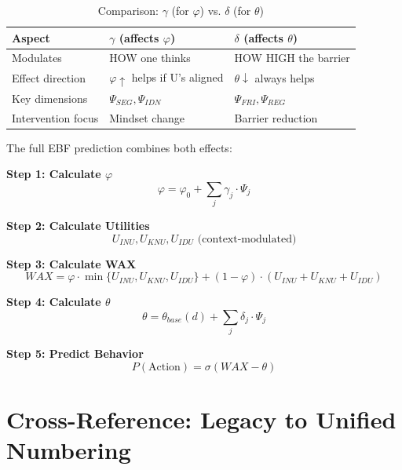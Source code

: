 \begin{table}[htbp]
\centering
\caption{Comparison: $\gamma$ (for $\varphi$) vs. $\delta$ (for $\theta$)}
\label{tab:gamma-vs-delta}
\begin{tabular}{@{}lll@{}}
\toprule
\textbf{Aspect} & \textbf{$\gamma$ (affects $\varphi$)} & \textbf{$\delta$ (affects $\theta$)} \\
\midrule
Modulates & HOW one thinks & HOW HIGH the barrier \\
Effect direction & $\varphi \uparrow$ helps if U's aligned & $\theta \downarrow$ always helps \\
Key dimensions & $\Psi_{SEG}, \Psi_{IDN}$ & $\Psi_{FRI}, \Psi_{REG}$ \\
Intervention focus & Mindset change & Barrier reduction \\
\bottomrule
\end{tabular}
\end{table}

\begin{tcolorbox}[colback=blue!5!white,colframe=blue!75!black,title=Complete Behavioral Prediction Model]
The full EBF prediction combines both effects:

\textbf{Step 1: Calculate $\varphi$}
\begin{equation}
\varphi = \varphi_0 + \sum_j \gamma_j \cdot \Psi_j
\end{equation}

\textbf{Step 2: Calculate Utilities}
\begin{equation}
U_{INU}, U_{KNU}, U_{IDU} \text{ (context-modulated)}
\end{equation}

\textbf{Step 3: Calculate WAX}
\begin{equation}
WAX = \varphi \cdot \min\{U_{INU}, U_{KNU}, U_{IDU}\} + (1-\varphi) \cdot (U_{INU} + U_{KNU} + U_{IDU})
\end{equation}

\textbf{Step 4: Calculate $\theta$}
\begin{equation}
\theta = \theta_{base}(d) + \sum_j \delta_j \cdot \Psi_j
\end{equation}

\textbf{Step 5: Predict Behavior}
\begin{equation}
P(\text{Action}) = \sigma(WAX - \theta)
\end{equation}
\end{tcolorbox}


\section{Cross-Reference: Legacy to Unified Numbering}
\label{sec:av-crossref}

